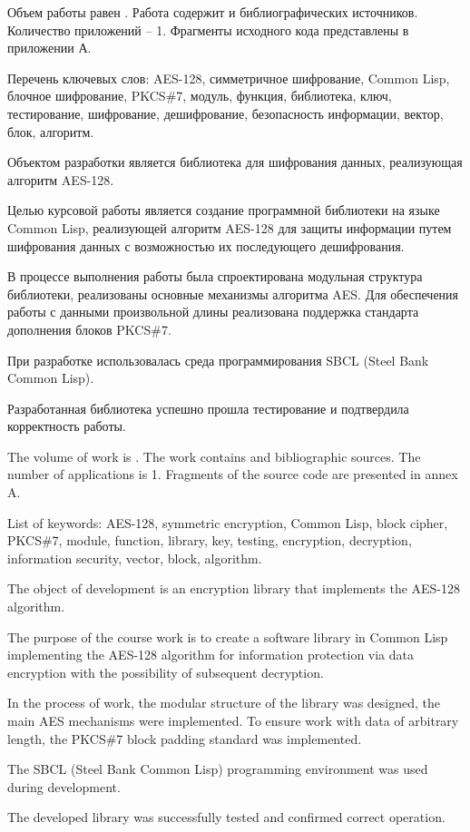 
Объем работы равен . Работа содержит  и  библиографических источников. Количество приложений – 1. Фрагменты исходного кода представлены в приложении А.

Перечень ключевых слов: AES-128, симметричное шифрование, Common Lisp, блочное шифрование, PKCS\#7, модуль, функция, библиотека, ключ, тестирование, шифрование, дешифрование, безопасность информации, вектор, блок, алгоритм.

Объектом разработки является библиотека для шифрования данных, реализующая алгоритм AES-128.

Целью курсовой работы является создание программной библиотеки на языке Common Lisp, реализующей алгоритм AES-128 для защиты информации путем шифрования данных с возможностью их последующего дешифрования.

В процессе выполнения работы была спроектирована модульная структура библиотеки, реализованы основные механизмы алгоритма AES. Для обеспечения работы с данными произвольной длины реализована поддержка стандарта дополнения блоков PKCS\#7.

При разработке использовалась среда программирования SBCL (Steel Bank Common Lisp).

Разработанная библиотека успешно прошла тестирование и подтвердила корректность работы.


The volume of work is . The work contains  and  bibliographic sources. The number of applications is 1. Fragments of the source code are presented in annex A.

List of keywords: AES-128, symmetric encryption, Common Lisp, block cipher, PKCS\#7, module, function, library, key, testing, encryption, decryption, information security, vector, block, algorithm.

The object of development is an encryption library that implements the AES-128 algorithm.

The purpose of the course work is to create a software library in Common Lisp implementing the AES-128 algorithm for information protection via data encryption with the possibility of subsequent decryption.

In the process of work, the modular structure of the library was designed, the main AES mechanisms were implemented. To ensure work with data of arbitrary length, the PKCS\#7 block padding standard was implemented.

The SBCL (Steel Bank Common Lisp) programming environment was used during development.

The developed library was successfully tested and confirmed correct operation.

